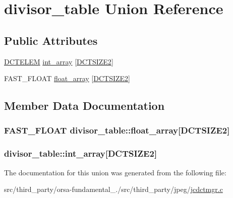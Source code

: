 \hypertarget{uniondivisor__table}{}\section{divisor\+\_\+table Union Reference}
\label{uniondivisor__table}
\subsection*{Public Attributes}
\begin{DoxyCompactItemize}
\item 
\hyperlink{jdct_8h_a00460e5dc80a70f254891b5a8abe739f}{D\+C\+T\+E\+L\+E\+M} \hyperlink{uniondivisor__table_a57e8528abf46b37f84205e45bfd86902}{int\+\_\+array} \mbox{[}\hyperlink{jpeglib_8h_af89dff4200396563157d4a1e59da3bdf}{D\+C\+T\+S\+I\+Z\+E2}\mbox{]}
\item 
F\+A\+S\+T\+\_\+\+F\+L\+O\+A\+T \hyperlink{uniondivisor__table_aab561bc3498ee69f4177e4a1b17d015a}{float\+\_\+array} \mbox{[}\hyperlink{jpeglib_8h_af89dff4200396563157d4a1e59da3bdf}{D\+C\+T\+S\+I\+Z\+E2}\mbox{]}
\end{DoxyCompactItemize}


\subsection{Member Data Documentation}
\hypertarget{uniondivisor__table_aab561bc3498ee69f4177e4a1b17d015a}{}
\subsubsection[{float\+\_\+array}]{\setlength{\rightskip}{0pt plus 5cm}F\+A\+S\+T\+\_\+\+F\+L\+O\+A\+T divisor\+\_\+table\+::float\+\_\+array\mbox{[}{\bf D\+C\+T\+S\+I\+Z\+E2}\mbox{]}}\label{uniondivisor__table_aab561bc3498ee69f4177e4a1b17d015a}
\hypertarget{uniondivisor__table_a57e8528abf46b37f84205e45bfd86902}{}
\subsubsection[{int\+\_\+array}]{ divisor\+\_\+table\+::int\+\_\+array\mbox{[}{\bf D\+C\+T\+S\+I\+Z\+E2}\mbox{]}}\label{uniondivisor__table_a57e8528abf46b37f84205e45bfd86902}


The documentation for this union was generated from the following file\+:\begin{DoxyCompactItemize}
\item 
src/third\+\_\+party/orsa-\/fundamental\+\_./src/third\+\_\+party/jpeg/\hyperlink{jcdctmgr_8c}{jcdctmgr.\+c}\end{DoxyCompactItemize}
